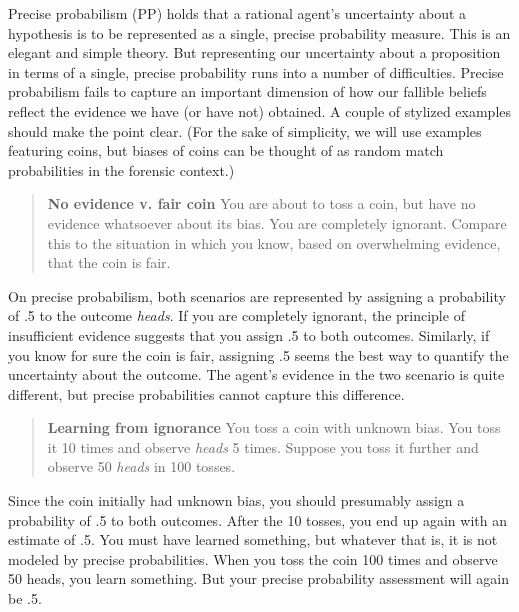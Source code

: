 \documentclass[
  10pt,
  dvipsnames,enabledeprecatedfontcommands]{scrartcl}
\begin{document}
Precise probabilism (\textsf{PP}) holds that a rational agent's
uncertainty about a hypothesis is to be represented as a single, precise
probability measure. This is an elegant and simple theory. But
representing our uncertainty about a proposition in terms of a single,
precise probability runs into a number of difficulties. Precise
probabilism fails to capture an important dimension of how our fallible
beliefs reflect the evidence we have (or have not) obtained. A couple of
stylized examples should make the point clear. (For the sake of
simplicity, we will use examples featuring coins, but biases of coins
can be thought of as random match probabilities in the forensic
context.)

\begin{quote}
\textbf{No evidence v. fair coin}
You are about to toss a coin, but have no evidence 
whatsoever about its bias. You are completely ignorant. 
Compare this to the situation in which you know, 
based on overwhelming evidence, that the coin is fair. 
\end{quote}

\noindent On precise probabilism, both scenarios are represented by
assigning a probability of .5 to the outcome \emph{heads}. If you are
completely ignorant, the principle of insufficient evidence suggests
that you assign .5 to both outcomes. Similarly, if you know for sure the
coin is fair, assigning .5 seems the best way to quantify the
uncertainty about the outcome. The agent's evidence in the two scenario
is quite different, but precise probabilities cannot capture this
difference.

\begin{quote}
\textbf{Learning from ignorance}
You toss a coin with unknown bias. You toss it 10 times and observe \emph{heads} 5 times. Suppose you toss it further and observe 50 \emph{heads} in 100 tosses. 
\end{quote}

\noindent Since the coin initially had unknown bias, you should
presumably assign a probability of .5 to both outcomes. After the 10
tosses, you end up again with an estimate of .5. You must have learned
something, but whatever that is, it is not modeled by precise
probabilities. When you toss the coin 100 times and observe 50 heads,
you learn something. But your precise probability assessment will again
be .5.
\end{document}
